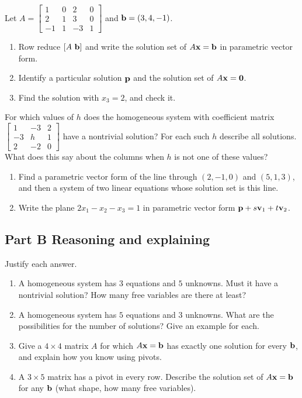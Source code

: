 \documentclass[11pt]{article}
\begin{document}
Let $A=\begin{bmatrix}1&0&2&0\\2&1&3&0\\-1&1&-3&1\end{bmatrix}$ and $\mathbf{b}=(3,4,-1)$.
\begin{enumerate}
  \item Row reduce $[A\ \mathbf{b}]$ and write the solution set of $A\mathbf{x}=\mathbf{b}$ in parametric vector form.
  \item Identify a particular solution $\mathbf{p}$ and the solution set of $A\mathbf{x}=\mathbf{0}$.
  \item Find the solution with $x_3=2$, and check it.
\end{enumerate}

\problem[A parameter.]
For which values of $h$ does the homogeneous system with coefficient matrix $\begin{bmatrix}1&-3&2\\-3&h&1\\2&-2&0\end{bmatrix}$ have a nontrivial solution? For each such $h$ describe all solutions. What does this say about the columns when $h$ is not one of these values?

\begin{enumerate}
  \item Find a parametric vector form of the line through $(2,-1,0)$ and $(5,1,3)$, and then a system of two linear equations whose solution set is this line.
  \item Write the plane $2x_1-x_2-x_3=1$ in parametric vector form $\mathbf{p}+s\mathbf{v}_1+t\mathbf{v}_2$.
\end{enumerate}

\subsection*{Part B \quad Reasoning and explaining}

\problem[Counting.]
Justify each answer.
\begin{enumerate}
  \item A homogeneous system has $3$ equations and $5$ unknowns. Must it have a nontrivial solution? How many free variables are there at least?
  \item A homogeneous system has $5$ equations and $3$ unknowns. What are the possibilities for the number of solutions? Give an example for each.
  \item Give a $4\times4$ matrix $A$ for which $A\mathbf{x}=\mathbf{b}$ has exactly one solution for every $\mathbf{b}$, and explain how you know using pivots.
  \item A $3\times5$ matrix has a pivot in every row. Describe the solution set of $A\mathbf{x}=\mathbf{b}$ for any $\mathbf{b}$ (what shape, how many free variables).
\end{enumerate}
\end{document}
